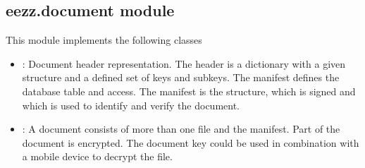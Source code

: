 \documentclass[letterpaper,10pt,english]{sphinxmanual}
\begin{document}
\subsection{eezz.document module}
\label{\detokenize{eezz:module-eezz.document}}\label{\detokenize{eezz:eezz-document-module}}
\sphinxAtStartPar
This module implements the following classes
\begin{itemize}
\item {} 
\sphinxAtStartPar
{\hyperref[\detokenize{eezz:eezz.document.TManifest}]{}}:   Document header representation. The header is a dictionary with a given     structure and a defined set of keys and sub\sphinxhyphen{}keys. The manifest defines the database table and access.     The manifest is the structure, which is signed and which is used to identify and verify the document.

\item {} 
\sphinxAtStartPar
{}:  A document consists of more than one file and the manifest. Part of the     document is encrypted. The document key could be used in combination with a mobile device to decrypt the file.

\end{itemize}
\end{document}
